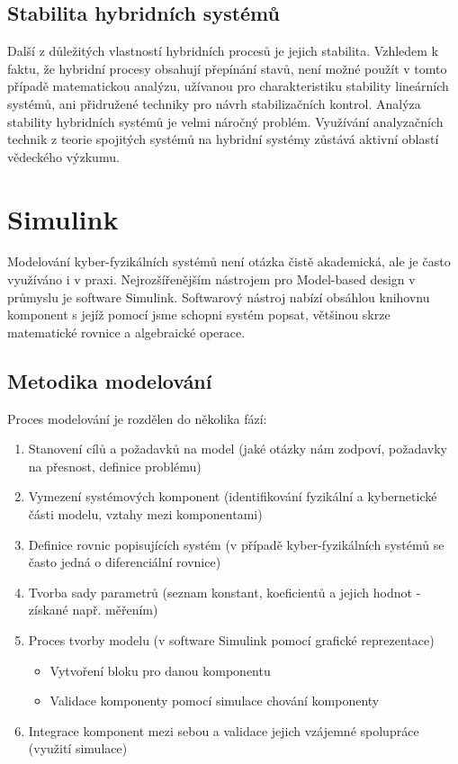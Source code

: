 \documentclass[conference,a4paper]{IEEEtran-CZ}
\begin{document}
\subsection{Stabilita hybridních systémů}

Další z důležitých vlastností hybridních procesů je jejich stabilita. Vzhledem k faktu, že hybridní procesy
obsahují přepínání stavů, není možné použít v tomto případě matematickou analýzu, užívanou pro 
charakteristiku stability lineárních systémů, ani přidružené techniky pro návrh stabilizačních kontrol.
Analýza stability hybridních systémů je velmi náročný problém. Využívání analyzačních technik z teorie 
spojitých systémů na hybridní systémy zůstává aktivní oblastí vědeckého výzkumu.\cite{Rajeev:2015}

\section{Simulink}

Modelování kyber-fyzikálních systémů není otázka čistě akademická, ale je často využíváno i v praxi.
Nejrozšířenějším nástrojem pro Model-based design v průmyslu je software Simulink. Softwarový 
nástroj nabízí obsáhlou knihovnu komponent s jejíž pomocí jsme schopni systém popsat, 
většinou skrze matematické rovnice a algebraické operace.

\subsection{Metodika modelování}

Proces modelování je rozdělen do několika fází:

\begin{enumerate}
  \item Stanovení cílů a požadavků na model (jaké otázky nám zodpoví, požadavky na přesnost, definice problému)
  \item Vymezení systémových komponent (identifikování fyzikální a kybernetické části modelu, vztahy mezi komponentami)
  \item Definice rovnic popisujících systém (v případě kyber-fyzikálních systémů se často jedná o diferenciální rovnice)
  \item Tvorba sady parametrů (seznam konstant, koeficientů a jejich hodnot - získané např. měřením)
  \item Proces tvorby modelu (v software Simulink pomocí grafické reprezentace)
 	\begin{itemize}
	  \item Vytvoření bloku pro danou komponentu
  	  \item Validace komponenty pomocí simulace chování komponenty
	\end{itemize}
  \item Integrace komponent mezi sebou a validace jejich vzájemné spolupráce (využití simulace)
\end{enumerate}
\end{document}

